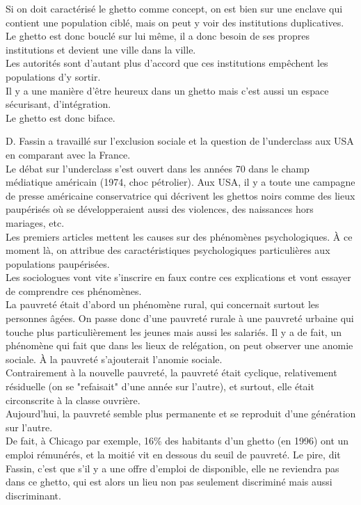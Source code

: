 \documentclass[12pt, a4paper, openany]{book}
\begin{document}
Si on doit caractérisé le ghetto comme concept, on est bien sur une enclave qui contient une population ciblé, mais on peut y voir des institutions duplicatives. Le ghetto est donc bouclé sur lui même, il a donc besoin de ses propres institutions et devient une ville dans la ville. \\
Les autorités sont d'autant plus d'accord que ces institutions empêchent les populations d'y sortir. \\
Il y a une manière d'être heureux dans un ghetto mais c'est aussi un espace sécurisant, d'intégration. \\
Le ghetto est donc biface. 


D. Fassin a travaillé sur l'exclusion sociale et la question de l'underclass aux USA en comparant avec la France. \\
Le débat sur l'underclass s'est ouvert dans les années 70 dans le champ médiatique américain (1974, choc pétrolier). Aux USA, il y a toute une campagne de presse américaine conservatrice qui décrivent les ghettos noirs comme des lieux paupérisés où se développeraient aussi des violences, des naissances hors mariages, etc. \\
Les premiers articles mettent les causes sur des phénomènes psychologiques. À ce moment là, on attribue des caractéristiques psychologiques particulières aux populations paupérisées. \\
Les sociologues vont vite s'inscrire en faux contre ces explications et vont essayer de comprendre ces phénomènes. \\
La pauvreté était d'abord un phénomène rural, qui concernait surtout les personnes âgées. On passe donc d'une pauvreté rurale à une pauvreté urbaine qui touche plus particulièrement les jeunes mais aussi les salariés. Il y a de fait, un phénomène qui fait que dans les lieux de relégation, on peut observer une anomie sociale. À la pauvreté s'ajouterait l'anomie sociale. \\
Contrairement à la nouvelle pauvreté, la pauvreté était cyclique, relativement résiduelle (on se "refaisait" d'une année sur l'autre), et surtout, elle était circonscrite à la classe ouvrière. \\
Aujourd'hui, la pauvreté semble plus permanente et se reproduit d'une génération sur l'autre. \\
De fait, à Chicago par exemple, 16\% des habitants d'un ghetto (en 1996) ont un emploi rémunérés, et la moitié vit en dessous du seuil de pauvreté. Le pire, dit Fassin, c'est que s'il y a une offre d'emploi de disponible, elle ne reviendra pas dans ce ghetto, qui est alors un lieu non pas seulement discriminé mais aussi discriminant. 
\end{document}
